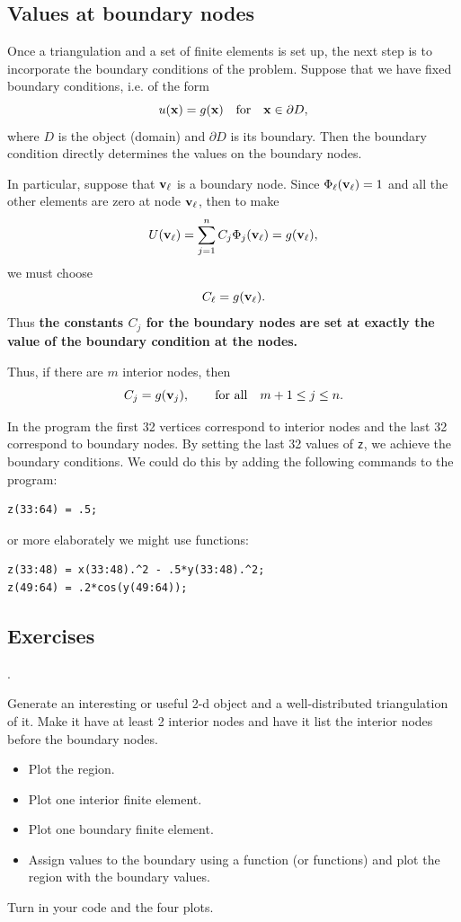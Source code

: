 
\subsection*{Values at boundary nodes}

Once a triangulation and a set of finite elements is set up, the next
step is to incorporate the boundary conditions of the problem. Suppose
that we have fixed boundary conditions, i.e. of the form
$$
u(\mathbf{x}) = g(\mathbf{x}) \quad  \text{for} \quad \mathbf{x} \in \partial D,
$$
where $D$ is the object (domain) and $\partial D$ is its boundary.
Then the boundary condition directly determines the
values on the boundary nodes.

In particular, suppose that $\mathbf{v}_\ell$
is a boundary node. Since $\Phi_\ell(\mathbf{v}_\ell) = 1$ and all the other elements
are zero at node $\mathbf{v}_\ell$, then to make
$$
U(\mathbf{v}_\ell) = \sum_{j=1}^n C_j \Phi_j(\mathbf{v}_\ell) = g(\mathbf{v}_\ell),
$$
we must choose
$$
  C_\ell = g(\mathbf{v}_\ell).
$$
Thus {\bf the constants $C_j$ for the boundary nodes are set at exactly the value of the
boundary condition at the nodes.}

Thus, if there are $m$ interior nodes, then
$$
    C_j = g(\mathbf{v}_j), \qquad \text{for all} \quad m+1 \le j \le n.
$$

In the program  the first 32 vertices
correspond to interior nodes and the last 32 correspond to boundary
nodes. By setting the last 32 values of \verb&z&, we achieve the
boundary conditions. We could do this by adding the following
commands to the program:
\begin{lstlisting}
z(33:64) = .5;
\end{lstlisting}
or more elaborately we might use functions:
\begin{lstlisting}
z(33:48) = x(33:48).^2 - .5*y(33:48).^2;
z(49:64) = .2*cos(y(49:64));
\end{lstlisting}



\subsection*{Exercises}

\begin{list}
{.}{}

\item \label{exr:ownFEregion}
Generate an interesting or useful 2-d object and a
well-distributed triangulation of it. 
Make it have at least 2 interior nodes and have it list the interior nodes before the boundary nodes.
\begin{itemize}
\item Plot the region.
\item Plot one interior finite element.
\item Plot one boundary finite element.
\item Assign values to the boundary using a function (or functions)
  and plot the region with the boundary values.
\end{itemize}
Turn in your code and the four plots.

\end{list}


